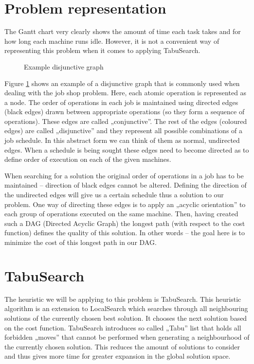 \documentclass[14pt]{article}
\begin{document}
\section{Problem representation}

The Gantt chart very clearly shows the amount of time each task takes and for how long each machine runs idle. However, it is not a convenient way of representing this problem when it comes to applying TabuSearch.

\begin{figure}[H]
  \centering
  \def\svgwidth{0.5\columnwidth}
  
  \caption{Example disjunctive graph}
  \label{example-disjunctive}
\end{figure}

Figure \ref{example-disjunctive} shows an example of a disjunctive graph that is commonly used when dealing with the job shop problem. Here, each atomic operation is represented as a node. The order of operations in each job is maintained using directed edges (black edges) drawn between appropriate operations (so they form a sequence of operations). These edges are called „conjunctive”. The rest of the edges (coloured edges) are called „disjunctive” and they represent all possible combinations of a job schedule. In this abstract form we can think of them as normal, undirected edges. When a schedule is being sought these edges need to become directed as to define order of execution on each of the given machines.

When searching for a solution the original order of operations in a job has to be maintained – direction of black edges cannot be altered. Defining the direction of the undirected edges will give us a certain schedule thus a solution to our problem. One way of directing these edges is to apply an „acyclic orientation” to each group of operations executed on the same machine. Then, having created such a DAG (Directed Acyclic Graph) the longest path (with respect to the cost function) defines the quality of this solution. In other words – the goal here is to minimize the cost of this longest path in our DAG.

\section{TabuSearch}

The heuristic we will be applying to this problem is TabuSearch. This heuristic algorithm is an extension to LocalSearch which searches through all neighbouring solutions of the currently chosen best solution. It chooses the next solution based on the cost function. TabuSearch introduces so called „Tabu” list that holds all forbidden „moves” that cannot be performed when generating a neighbourhood of the currently chosen solution. This reduces the amount of solutions to consider and thus gives more time for greater expansion in the global solution space.
\end{document}
